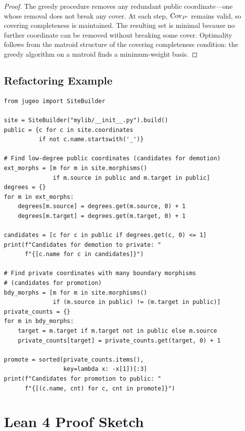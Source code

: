 \documentclass[11pt]{article}
\begin{document}
\begin{proof}
The greedy procedure removes any redundant public coordinate---one whose
removal does not break any cover.  At each step, $\mathrm{Cov}_{P'}$ remains
valid, so covering completeness is maintained.  The resulting set is
minimal because no further coordinate can be removed without breaking
some cover.  Optimality follows from the matroid structure of the
covering completeness condition: the greedy algorithm on a matroid
finds a minimum-weight basis.
\end{proof}

\subsection{Refactoring Example}

\begin{lstlisting}[style=jugeo-python]
from jugeo import SiteBuilder

site = SiteBuilder("mylib/__init__.py").build()
public = {c for c in site.coordinates
          if not c.name.startswith('_')}

# Find low-degree public coordinates (candidates for demotion)
ext_morphs = [m for m in site.morphisms()
              if m.source in public and m.target in public]
degrees = {}
for m in ext_morphs:
    degrees[m.source] = degrees.get(m.source, 0) + 1
    degrees[m.target] = degrees.get(m.target, 0) + 1

candidates = [c for c in public if degrees.get(c, 0) <= 1]
print(f"Candidates for demotion to private: "
      f"{[c.name for c in candidates]}")

# Find private coordinates with many boundary morphisms
# (candidates for promotion)
bdy_morphs = [m for m in site.morphisms()
              if (m.source in public) != (m.target in public)]
private_counts = {}
for m in bdy_morphs:
    target = m.target if m.target not in public else m.source
    private_counts[target] = private_counts.get(target, 0) + 1

promote = sorted(private_counts.items(),
                 key=lambda x: -x[1])[:3]
print(f"Candidates for promotion to public: "
      f"{[(c.name, cnt) for c, cnt in promote]}")
\end{lstlisting}

\section{Lean 4 Proof Sketch}\label{sec:lean-proof}
\end{document}
